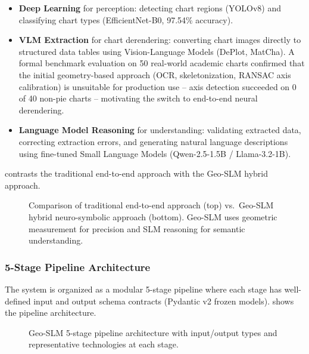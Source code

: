 \begin{itemize}
    \item \textbf{Deep Learning} for perception: detecting chart regions (YOLOv8) and
          classifying chart types (EfficientNet-B0, 97.54\% accuracy).
    \item \textbf{VLM Extraction} for chart derendering: converting chart images
          directly to structured data tables using Vision-Language Models (DePlot,
          MatCha). A formal benchmark evaluation on 50 real-world academic charts
          confirmed that the initial geometry-based approach (OCR, skeletonization,
          RANSAC axis calibration) is unsuitable for production use -- axis detection
          succeeded on 0 of 40 non-pie charts -- motivating the switch to end-to-end
          neural derendering.
    \item \textbf{Language Model Reasoning} for understanding: validating extracted
          data, correcting extraction errors, and generating natural language descriptions
          using fine-tuned Small Language Models (Qwen-2.5-1.5B / Llama-3.2-1B).
\end{itemize}

 contrasts the traditional end-to-end approach with the Geo-SLM
hybrid approach.

\begin{figure}[htbp]
\centering

\caption{Comparison of traditional end-to-end approach (top) vs.\ Geo-SLM hybrid
    neuro-symbolic approach (bottom). Geo-SLM uses geometric measurement for precision
    and SLM reasoning for semantic understanding.}
\label{fig:approach_cmp}
\end{figure}

\subsubsection{5-Stage Pipeline Architecture}

The system is organized as a modular 5-stage pipeline where each stage has well-defined
input and output schema contracts (Pydantic v2 frozen models). 
shows the pipeline architecture.

\begin{figure}[htbp]
\centering

\caption{Geo-SLM 5-stage pipeline architecture with input/output types and
    representative technologies at each stage.}
\label{fig:pipeline_arch}
\end{figure}

